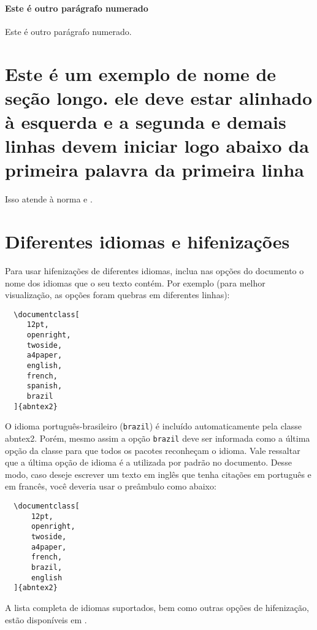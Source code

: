 \documentclass[article,12pt,oneside,a4paper,chapter=TITLE,
			   english,brazil]{abntex2}
\begin{document}
\begin{anexosenv}
\paragraph{Este é outro parágrafo numerado}\label{sec-exemplo-paragrafo-outro}

Este é outro parágrafo numerado.

\section{Este é um exemplo de nome de seção longo. ele deve estar alinhado à esquerda e a segunda e demais linhas devem iniciar logo abaixo da primeira palavra da primeira linha}

Isso atende à norma  e .

\section{Diferentes idiomas e hifenizações}
\label{sec-hifenizacao}

Para usar hifenizações de diferentes idiomas, inclua nas opções do documento o nome dos idiomas que o seu texto contém. Por exemplo (para melhor visualização, as opções foram quebras em diferentes linhas):
\begin{verbatim}
  \documentclass[
     12pt,
     openright,
     twoside,
     a4paper,
     english,
     french,
     spanish,
     brazil
  ]{abntex2}
\end{verbatim}

O idioma português-brasileiro (\texttt{brazil}) é incluído automaticamente pela classe \textsf{abntex2}. Porém, mesmo assim a opção \texttt{brazil} deve ser informada como a última opção da classe para que todos os pacotes reconheçam o idioma. Vale ressaltar que a última opção de idioma é a utilizada por padrão no documento. Desse modo, caso deseje escrever um texto em inglês que tenha citações em português e em francês, você deveria usar o preâmbulo como abaixo:
\begin{verbatim}
  \documentclass[
      12pt,
      openright,
      twoside,
      a4paper,
      french,
      brazil,
      english
  ]{abntex2}
\end{verbatim}

A lista completa de idiomas suportados, bem como outras opções de hifenização, estão disponíveis em .


\end{anexosenv}
\end{document}
